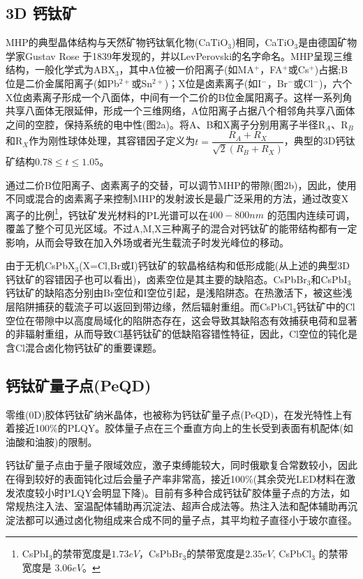 \documentclass{phyasgn}\usepackage{nag}
\begin{document}
\subsection{3D 钙钛矿}
\par MHP的典型晶体结构与天然矿物钙钛氧化物(CaTiO$_3$)相同，CaTiO$_3$是由德国矿物学家Gustav Rose 于1839年发现的，并以LevPerovski的名字命名。MHP呈现三维结构，一般化学式为ABX$_3$，其中A位被一价阳离子(如MA$^+$，FA$^+$或Cs$^+$)占据;B位是二价金属阳离子(如Pb$^{2+}$或Sn$^{2+}$)；X位是卤素离子(如I$^{-}$，Br$^{-}$或Cl$^{-}$)，六个X位卤素离子形成一个八面体，中间有一个二价的B位金属阳离子。这样一系列角共享八面体无限延伸，形成一个三维网络，A位阳离子占据八个相邻角共享八面体之间的空腔，保持系统的电中性(图2a)。将A、B和X离子分别用离子半径R$_{A}$、R$_{B}$和R$_{X}$作为刚性球体处理，其容错因子定义为$t=\dfrac{R_{A}+R_{X}}{\sqrt{2}(R_{B}+R_{X})}$，典型的3D钙钛矿结构$0.78\le t\le 1.05$。
\par 通过二价B位阳离子、卤素离子的交替，可以调节MHP的带隙(图2b)，因此，使用不同或混合的卤素离子来控制MHP的发射波长是最广泛采用的方法，通过改变X离子的比例\footnote{ CsPbI$_{3}$的禁带宽度是$1.73eV$\cite{swarnkar2016quantum}，CsPbBr$_{3}$的禁带宽度是$2.35 eV$\cite{becker2018bright}, CsPbCl$_{3}$ 的禁带宽度是 $3.06 eV$\cite{becker2018bright}。}，钙钛矿发光材料的PL光谱可以在$400-800 nm$ 的范围内连续可调，覆盖了整个可见光区域\cite{stranks2015metal}。不过A,M,X三种离子的混合对钙钛矿的能带结构都有一定影响，从而会导致在加入外场或者光生载流子时发光峰位的移动\cite{sutherland2016perovskite}。
\par 由于无机CsPbX$_3$(X=Cl,Br或I)钙钛矿的软晶格结构和低形成能(从上述的典型3D钙钛矿的容错因子也可以看出)，卤素空位是其主要的缺陷态\cite{pan2019halogen}。CsPbBr$_3$和CsPbI$_3$钙钛矿的缺陷态分别由Br空位和I空位引起，是浅陷阱态。在热激活下，被这些浅层陷阱捕获的载流子可以返回到带边缘，然后辐射重组。而CsPbCl$_3$钙钛矿中的Cl空位在带隙中以高度局域化的陷阱态存在，这会导致其缺陷态有效捕获电荷和显著的非辐射重组，从而导致Cl基钙钛矿的低缺陷容错性特征，因此，Cl空位的钝化是含Cl混合卤化物钙钛矿的重要课题。
\subsection{钙钛矿量子点(PeQD)}
零维(0D)胶体钙钛矿纳米晶体，也被称为钙钛矿量子点(PeQD)，在发光特性上有着接近100\%的PLQY。胶体量子点在三个垂直方向上的生长受到表面有机配体(如油酸和油胺)的限制。
\par 钙钛矿量子点由于量子限域效应，激子束缚能较大，同时俄歇复合常数较小，因此在得到较好的表面钝化过后会量子产率非常高，接近100\%\cite{li2016cspbx3}(其余荧光LED材料在激发浓度较小时PLQY会明显下降)。目前有多种合成钙钛矿胶体量子点的方法，如常规热注入法、室温配体辅助再沉淀法、超声合成法等。热注入法和配体辅助再沉淀法都可以通过卤化物组成来合成不同的量子点，其平均粒子直径小于玻尔直径。
\end{document}
